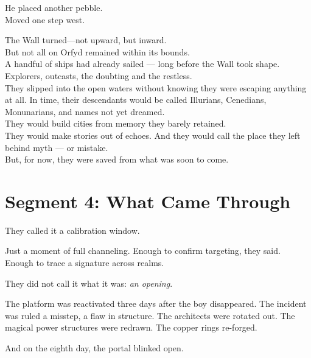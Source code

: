 \documentclass[9pt]{article}
\begin{document}
\vspace{0.5em}
He placed another pebble.\\
Moved one step west.

\vspace{0.5em}
The Wall turned---not upward, but inward.\\

But not all on Orfyd remained within its bounds.\\

A handful of ships had already sailed — long before the Wall took shape.\\

Explorers, outcasts, the doubting and the restless.\\

They slipped into the open waters without knowing they were escaping anything at all.
In time, their descendants would be called Illurians, Cenedians, Monunarians, and names not yet dreamed.\\

They would build cities from memory they barely retained.\\

They would make stories out of echoes.
And they would call the place they left behind myth — or mistake.\\

But, for now, they were saved from what was soon to come.

\newpage

\section*{Segment 4: What Came Through}

They called it a calibration window.

\vspace{0.5em}
Just a moment of full channeling. Enough to confirm targeting, they said. Enough to trace a signature across realms.

\vspace{0.5em}
They did not call it what it was: \textit{an opening}.

\vspace{0.5em}
The platform was reactivated three days after the boy disappeared. The incident was ruled a misstep, a flaw in structure. The architects were rotated out. The magical power structures were redrawn. The copper rings re-forged.

\vspace{0.5em}
And on the eighth day, the portal blinked open.
\end{document}
